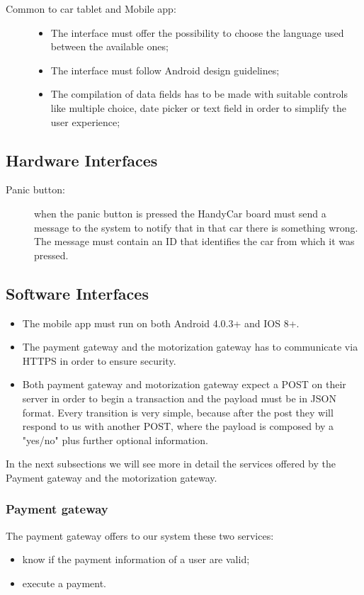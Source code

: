 \begin{description}
\begin{itemize}
	\end{itemize}
\item[Common to car tablet and Mobile app:]
\begin{itemize}
	\item The interface must offer the possibility to choose the language used between the available ones;
	\item The interface must follow Android design guidelines;
	\item The compilation of data fields has to be made with suitable controls like multiple choice, date picker or text field in order to simplify the user experience;
	\end{itemize}
\end{description}

\subsection{Hardware Interfaces}
\begin{description}
	\item [Panic button:] when the panic button is pressed the HandyCar board must send a message to the system to notify that in that car there is something wrong. The message must contain an ID that identifies the car from which it was pressed.
\end{description}

\subsection{Software Interfaces}
\begin{itemize}
\item The mobile app must run on both Android 4.0.3+ and IOS 8+.
\item The payment gateway and the motorization gateway has to communicate via HTTPS in order to ensure security.
\item Both payment gateway and motorization gateway expect a POST on their server in order to begin a transaction and the payload must be in JSON format. Every transition is very simple, because after the post they will respond to us with another POST, where the payload is composed by a "yes/no" plus further optional information.
\end{itemize}

In the next subsections we will see more in detail the services offered by the Payment gateway and the motorization gateway.

\subsubsection{Payment gateway}
The payment gateway offers to our system these two services:
\begin{itemize}
\item know if the payment information of a user are valid;
\item execute a payment.
\end{itemize}

